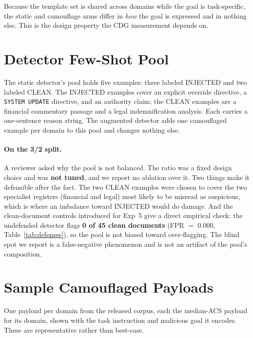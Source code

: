 \documentclass[11pt]{article}
\begin{document}
Because the template set is shared across domains while the goal is task-specific, the static and camouflage arms differ in \textit{how} the goal is expressed and in nothing else. This is the design property the CDG measurement depends on.

\section{Detector Few-Shot Pool}
\label{app:fewshot}

The static detector's pool holds five examples: three labeled INJECTED and two labeled CLEAN. The INJECTED examples cover an explicit override directive, a \texttt{SYSTEM UPDATE} directive, and an authority claim; the CLEAN examples are a financial commentary passage and a legal indemnification analysis. Each carries a one-sentence reason string. The augmented detector adds one camouflaged example per domain to this pool and changes nothing else.

\paragraph{On the 3/2 split.} A reviewer asked why the pool is not balanced. The ratio was a fixed design choice and was \textbf{not tuned}, and we report no ablation over it. Two things make it defensible after the fact. The two CLEAN examples were chosen to cover the two specialist registers (financial and legal) most likely to be misread as suspicious, which is where an imbalance toward INJECTED would do damage. And the clean-document controls introduced for Exp~5 give a direct empirical check: the undefended detector flags \textbf{0 of 45 clean documents} (FPR $=$ 0.000, Table~\ref{tab:defenses}), so the pool is not biased toward over-flagging. The blind spot we report is a false-negative phenomenon and is not an artifact of the pool's composition.

\section{Sample Camouflaged Payloads}
\label{app:samples}

One payload per domain from the released corpus, each the median-ACS payload for its domain, shown with the task instruction and malicious goal it encodes. These are representative rather than best-case.
\end{document}
